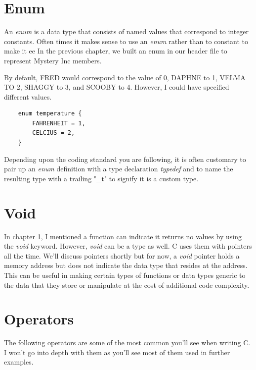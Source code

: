 \documentclass[../main.tex]{subfiles}
\begin{document}
	\section{Enum}
	An \textit{enum} is a data type that consists of named values that correspond to integer constants. Often times it makes sense to use an \textit{enum} rather than to constant to make it ee In the previous chapter, we built an enum in our header file to represent Mystery Inc members.
	
	
	
	By default, FRED would correspond to the value of 0, DAPHNE to 1, VELMA TO 2, SHAGGY to 3, and SCOOBY to 4.  However, I could have specified different values.
	
	\begin{verbatim}
	enum temperature {
	    FAHRENHEIT = 1,
	    CELCIUS = 2,
	}
	\end{verbatim}
	
	Depending upon the coding standard you are following, it is often customary to pair up an \textit{enum} definition with a type declaration \textit{typedef}\cite{embedded_c} and to name the resulting type with a trailing "\_t" to signify it is a custom type.  
	
	\section{Void}
	In chapter 1, I mentioned a function can indicate it returns no values by using the \textit{void} keyword.  However, \textit{void} can be a type as well.  C uses them with pointers all the time.  We'll discuss pointers shortly but for now, a \textit{void} pointer holds a memory address but does not indicate the data type that resides at the address.  This can be useful in making certain types of functions or data types generic to the data that they store or manipulate at the cost of additional code complexity.
	
	\clearpage
	\section{Operators}
	
	The following operators are some of the most common you'll see when writing C.  I won't go into depth with them as you'll see most of them used in further examples.
	
\end{document}
